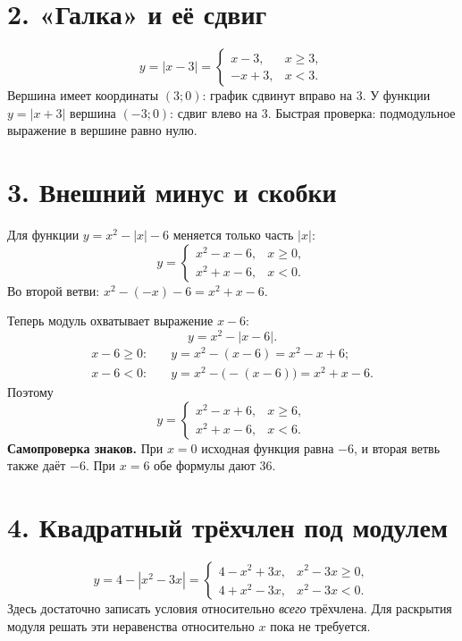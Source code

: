 \documentclass[a4paper,12pt]{article}
\newcommand{\topic}[1]{\section*{\color{darkaccent}#1}}
\newcommand{\key}[1]{\textbf{\color{darkaccent}#1}}
\begin{document}
\topic{2. «Галка» и её сдвиг}
\[
y=|x-3|=\begin{cases}x-3,&x\ge3,\\-x+3,&x<3.\end{cases}
\]
Вершина имеет координаты $(3;0)$: график сдвинут вправо на $3$. У функции $y=|x+3|$ вершина $(-3;0)$: сдвиг влево на $3$. Быстрая проверка: подмодульное выражение в вершине равно нулю.
\begin{center}
\end{center}
\clearpage
\topic{3. Внешний минус и скобки}
Для функции $y=x^2-|x|-6$ меняется только часть $|x|$:
\[
y=\begin{cases}x^2-x-6,&x\ge0,\\x^2+x-6,&x<0.\end{cases}
\]
Во второй ветви: $x^2-(-x)-6=x^2+x-6$.

Теперь модуль охватывает выражение $x-6$:
\[
y=x^2-|x-6|.
\]
\begin{align*}
x-6\ge0:&\quad y=x^2-(x-6)=x^2-x+6;\\
x-6<0:&\quad y=x^2-\bigl(-(x-6)\bigr)=x^2+x-6.
\end{align*}
Поэтому
\[
y=\begin{cases}x^2-x+6,&x\ge6,\\x^2+x-6,&x<6.\end{cases}
\]
\key{Самопроверка знаков.} При $x=0$ исходная функция равна $-6$, и вторая ветвь также даёт $-6$. При $x=6$ обе формулы дают $36$.

\topic{4. Квадратный трёхчлен под модулем}
\[
y=4-|x^2-3x|=\begin{cases}4-x^2+3x,&x^2-3x\ge0,\\4+x^2-3x,&x^2-3x<0.\end{cases}
\]
Здесь достаточно записать условия относительно \emph{всего} трёхчлена. Для раскрытия модуля решать эти неравенства относительно $x$ пока не требуется.
\end{document}
